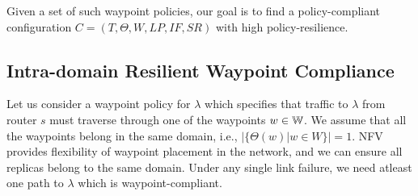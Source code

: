 
 Given a set of such waypoint policies, our goal is to
find a policy-compliant configuration $C=(T,\Theta,W,LP,IF,SR)$ 
with high policy-resilience.













\subsection{Intra-domain Resilient Waypoint Compliance}\label{sec:ospfwaypoint}
Let us consider a waypoint policy for $\lambda$ which
specifies that traffic to $\lambda$ from router $s$ 
must traverse through
one of the waypoints $w \in \mathbb{W}$. We assume that 
all the waypoints belong in the same domain, i.e., 
$|\{\Theta(w) | w \in W\}| = 1$. NFV provides 
flexibility of waypoint placement in the network, 
and we can ensure
all replicas belong to the same domain.  
Under any single link failure, we need atleast one path 
to $\lambda$ which is waypoint-compliant. 

